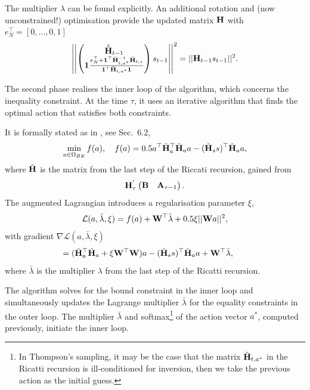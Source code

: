 The multiplier $\lambda$ can be found explicitly. An additional rotation and (now unconstrained!) optimisation provide the updated matrix $\mathbf{H}$
 with $e^{\top}_{N}=[0,\dots,0,1]$
\begin{equation*}
\left|\left|\begin{pmatrix} \tilde{\tilde{\mathbf{H}}}_{t-1}\\
\mathbf{1}\frac{e_N^{\top} + \mathbf{1}^{\top}\tilde{\mathbf{H}}_{t, a^{\ast}}^{-1}\tilde{\mathbf{H}}_{t,s}}{\mathbf{1}^{\top}\tilde{\mathbf{H}}_{t, a^{\ast}}\mathbf{1}}
\end{pmatrix}s_{t-1}\right|\right|^2 = ||\mathbf{H}_{t-1}s_{t-1}||^2.
\end{equation*}

The second phase realises the inner loop of the algorithm, which concerns the inequality constraint. At the time $\tau$, it uses an iterative algorithm that finds the optimal action that satisfies both constraints.

It is formally stated as in \cite{dostal2009optimal}, see Sec.\ 6.2,
\begin{equation}
    \label{e:SMALBEdef}
    \min_{a\in{\Omega_{BE}}}f(a), \quad f(a) = 0.5a^{\top}\tilde{\mathbf{H}}_a^{\top}\tilde{\mathbf{H}}_aa - (\tilde{\mathbf{H}}_ss)^{\top}\tilde{\mathbf{H}}_aa,
\end{equation}where $\tilde{\mathbf{H}}$ is the matrix from the last step of the Riccati recursion, gained from
$$\mathbf{H}^{'}_{\tau}\begin{pmatrix}\mathbf{B} & \mathbf{A}_{\tau-1}\end{pmatrix}.$$ The augmented Lagrangian introduces a regularisation parameter $\xi$,
\begin{equation*}
    \mathcal{L}(a, \bar{\lambda}, \xi) = f(a) + \mathbf{W}^{\top}\bar{\lambda} + 0.5\xi ||\mathbf{W}a||^2,
\end{equation*}
with gradient $ \nabla\mathcal{L}(a, \bar{\lambda}, \xi)$
\begin{equation*}
    \hspace*{-4ex}= (\tildemat{H}_a^{\top}\tildemat{H}_a + \xi \mat{W}^{\top}\mat{W})a - (\tildemat{H}_ss)^{\top}\tildemat{H}_aa + \mat{W}^{\top}\bar{\lambda},
\end{equation*}
where $\bar{\lambda}$ is the multiplier $\lambda$ from the last step of the Ricatti recursion.

The algorithm solves for the bound constraint in the inner loop and simultaneously updates the Lagrange multiplier $\bar{\lambda}$ for the equality constraints in the outer loop. The multiplier $\bar{\lambda}$ and softmax\footnote{In Thompson's sampling, it may be the case that the matrix $\tilde{\mathbf{H}}_{t,a^{\ast}}$ in the Ricatti recursion is ill-conditioned for inversion, then we take the previous action as the initial guess.} of the action vector $a^{\ast}$, computed previously, initiate the inner loop.

